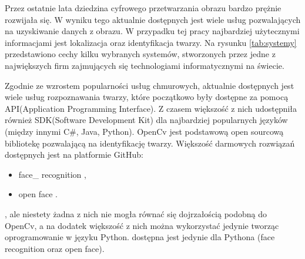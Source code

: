 Przez ostatnie lata dziedzina cyfrowego przetwarzania obrazu bardzo prężnie rozwijała się. W wyniku tego aktualnie dostępnych jest wiele usług pozwalających na uzyskiwanie danych z obrazu. W przypadku tej pracy najbardziej użytecznymi informacjami jest lokalizacja oraz identyfikacja twarzy.
Na rysunku \ref{tab:systemy} przedstawiono cechy kilku wybranych systemów, stworzonych przez jedne z największych firm zajmujących się technologiami informatycznymi na świecie.

\begin{table}[H]\label{tab:systemy}
	\centering
	\caption{Dostępne systemy przetwarzania obrazu}
\end{table}
Zgodnie ze wzrostem popularności usług chmurowych, aktualnie dostępnych jest wiele usług rozpoznawania twarzy, które początkowo były dostępne za pomocą API(Application Programming Interface). Z czasem większość z nich udostępniła również SDK(Software Development Kit) dla najbardziej popularnych języków (między innymi C\#, Java, Python). OpenCv jest podstawową open sourcową bibliotekę pozwalającą na identyfikację twarzy. Większość darmowych rozwiązań dostępnych jest na platformie GitHub:
\begin{itemize}
\item face\_ recognition \cite{face_reco_github},
\item open face \cite{open_face}.
\end{itemize}
, ale niestety żadna z nich nie mogła równać się dojrzałością podobną do OpenCv, a na dodatek większość z nich
można wykorzystać jedynie tworząc oprogramowanie w języku Python.
 dostępna jest jedynie dla Pythona (face recognition oraz open face).

